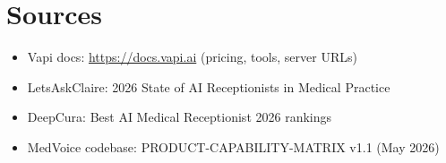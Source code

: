 \documentclass[11pt,a4paper]{report}
\begin{document}
\chapter{Sources}
\begin{itemize}[nosep]
  \item Vapi docs: \url{https://docs.vapi.ai} (pricing, tools, server URLs)
  \item LetsAskClaire: 2026 State of AI Receptionists in Medical Practice
  \item DeepCura: Best AI Medical Receptionist 2026 rankings
  \item MedVoice codebase: PRODUCT-CAPABILITY-MATRIX v1.1 (May 2026)
\end{itemize}
\end{document}

